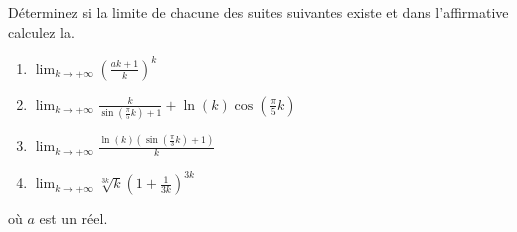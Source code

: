 
\begin{exercice}\label{exo0027}

Déterminez si la limite de chacune des suites suivantes
existe et dans l'affirmative calculez la.
\begin{enumerate}
	\item $ \lim_{k \to  +\infty }(\frac{a k +1}{k})^k $
	\item $ \lim_{k \to  +\infty} \frac{k}{\sin(\frac{\pi}{5}k)+1} + \ln(k)\cos(\frac{\pi}{5}k) $
	\item $ \lim_{k \to  +\infty} \frac{ \ln(k)(\sin(\frac{\pi}{3}k) +1)}{k} $
	\item $ \lim_{k \to  +\infty } \sqrt[3k]{k} (1 + \frac{1}{3k})^{3k} $
\end{enumerate}
où $a$ est un réel. 

\end{exercice}
